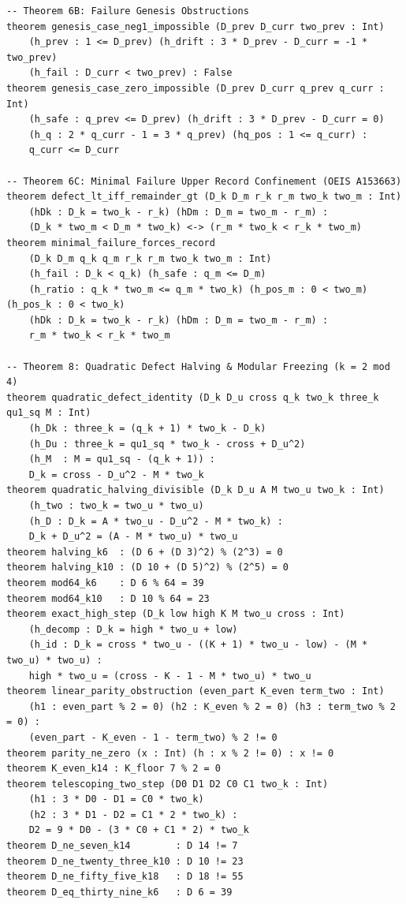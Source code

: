 \documentclass[11pt,reqno]{amsart}
\theoremstyle{definition}
\numberwithin{equation}{section}
\begin{document}
\begin{tiny}
\begin{verbatim}
-- Theorem 6B: Failure Genesis Obstructions
theorem genesis_case_neg1_impossible (D_prev D_curr two_prev : Int)
    (h_prev : 1 <= D_prev) (h_drift : 3 * D_prev - D_curr = -1 * two_prev)
    (h_fail : D_curr < two_prev) : False
theorem genesis_case_zero_impossible (D_prev D_curr q_prev q_curr : Int)
    (h_safe : q_prev <= D_prev) (h_drift : 3 * D_prev - D_curr = 0)
    (h_q : 2 * q_curr - 1 = 3 * q_prev) (hq_pos : 1 <= q_curr) :
    q_curr <= D_curr

-- Theorem 6C: Minimal Failure Upper Record Confinement (OEIS A153663)
theorem defect_lt_iff_remainder_gt (D_k D_m r_k r_m two_k two_m : Int)
    (hDk : D_k = two_k - r_k) (hDm : D_m = two_m - r_m) :
    (D_k * two_m < D_m * two_k) <-> (r_m * two_k < r_k * two_m)
theorem minimal_failure_forces_record
    (D_k D_m q_k q_m r_k r_m two_k two_m : Int)
    (h_fail : D_k < q_k) (h_safe : q_m <= D_m)
    (h_ratio : q_k * two_m <= q_m * two_k) (h_pos_m : 0 < two_m) (h_pos_k : 0 < two_k)
    (hDk : D_k = two_k - r_k) (hDm : D_m = two_m - r_m) :
    r_m * two_k < r_k * two_m

-- Theorem 8: Quadratic Defect Halving & Modular Freezing (k = 2 mod 4)
theorem quadratic_defect_identity (D_k D_u cross q_k two_k three_k qu1_sq M : Int)
    (h_Dk : three_k = (q_k + 1) * two_k - D_k)
    (h_Du : three_k = qu1_sq * two_k - cross + D_u^2)
    (h_M  : M = qu1_sq - (q_k + 1)) :
    D_k = cross - D_u^2 - M * two_k
theorem quadratic_halving_divisible (D_k D_u A M two_u two_k : Int)
    (h_two : two_k = two_u * two_u)
    (h_D : D_k = A * two_u - D_u^2 - M * two_k) :
    D_k + D_u^2 = (A - M * two_u) * two_u
theorem halving_k6  : (D 6 + (D 3)^2) % (2^3) = 0
theorem halving_k10 : (D 10 + (D 5)^2) % (2^5) = 0
theorem mod64_k6    : D 6 % 64 = 39
theorem mod64_k10   : D 10 % 64 = 23
theorem exact_high_step (D_k low high K M two_u cross : Int)
    (h_decomp : D_k = high * two_u + low)
    (h_id : D_k = cross * two_u - ((K + 1) * two_u - low) - (M * two_u) * two_u) :
    high * two_u = (cross - K - 1 - M * two_u) * two_u
theorem linear_parity_obstruction (even_part K_even term_two : Int)
    (h1 : even_part % 2 = 0) (h2 : K_even % 2 = 0) (h3 : term_two % 2 = 0) :
    (even_part - K_even - 1 - term_two) % 2 != 0
theorem parity_ne_zero (x : Int) (h : x % 2 != 0) : x != 0
theorem K_even_k14 : K_floor 7 % 2 = 0
theorem telescoping_two_step (D0 D1 D2 C0 C1 two_k : Int)
    (h1 : 3 * D0 - D1 = C0 * two_k)
    (h2 : 3 * D1 - D2 = C1 * 2 * two_k) :
    D2 = 9 * D0 - (3 * C0 + C1 * 2) * two_k
theorem D_ne_seven_k14        : D 14 != 7
theorem D_ne_twenty_three_k10 : D 10 != 23
theorem D_ne_fifty_five_k18   : D 18 != 55
theorem D_eq_thirty_nine_k6   : D 6 = 39


\end{verbatim}
\end{tiny}
\end{document}
